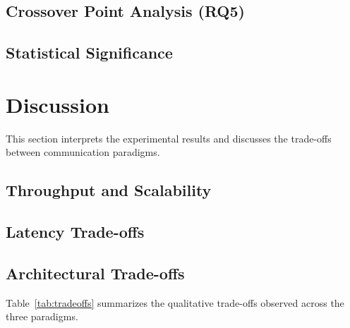 \documentclass[journal]{IEEEtran}
\begin{document}

\subsection{Crossover Point Analysis (RQ5)}
\label{subsec:results_crossover}


\subsection{Statistical Significance}
\label{subsec:results_statistics}



\section{Discussion}
\label{sec:discussion}

This section interprets the experimental results and discusses the trade-offs between communication paradigms.

\subsection{Throughput and Scalability}
\label{subsec:disc_throughput}


\subsection{Latency Trade-offs}
\label{subsec:disc_latency}


\subsection{Architectural Trade-offs}
\label{subsec:disc_tradeoffs}

Table~\ref{tab:tradeoffs} summarizes the qualitative trade-offs observed across the three paradigms.
\end{document}
